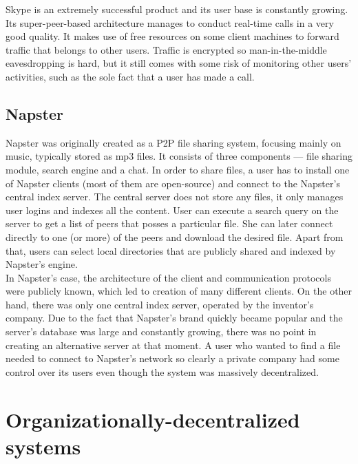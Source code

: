 \documentclass{pracamgren}
\begin{document}
Skype is an extremely successful product and its user base is constantly growing. Its super-peer-based architecture manages to conduct real-time calls in a very good quality. It makes use of free resources on some client machines to forward traffic that belongs to other users. Traffic is encrypted so man-in-the-middle eavesdropping is hard, but it still comes with some risk of monitoring other users' activities, such as the sole fact that a user has made a call.\\

\subsection{Napster}

Napster \cite{napster} was originally created as a P2P file sharing system, focusing mainly on music, typically stored as mp3 files. It consists of three components --- file sharing module, search engine and a chat. In order to share files, a user has to install one of Napster clients (most of them are open-source) and connect to the Napster's central index server. The central server does not store any files, it only manages user logins and indexes all the content. User can execute a search query on the server to get a list of peers that posses a particular file. She can later connect directly to one (or more) of the peers and download the desired file. Apart from that, users can select local directories that are publicly shared and indexed by Napster's engine.\\

In Napster's case, the architecture of the client and communication protocols were publicly known, which led to creation of many different clients. On the other hand, there was only one central index server, operated by the inventor's company. Due to the fact that Napster's brand quickly became popular and the server's database was large and constantly growing, there was no point in creating an alternative server at that moment. A user who wanted to find a file needed to connect to Napster's network so clearly a private company had some control over its users even though the system was massively decentralized.\\

\section{Organizationally-decentralized systems}
\end{document}
